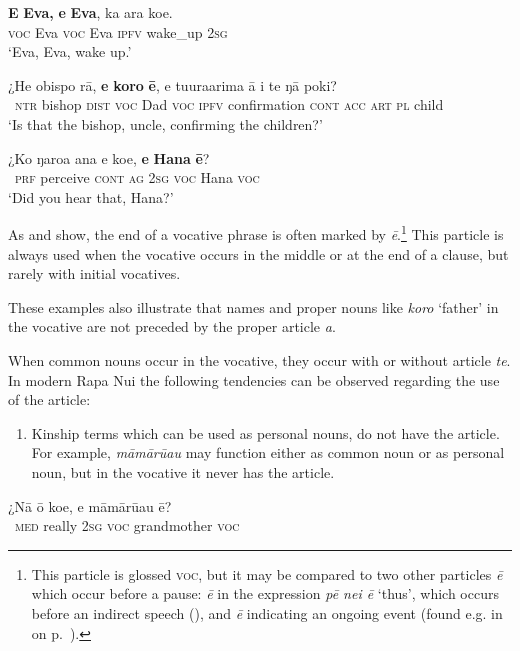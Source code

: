 \ea\label{ex:8.214}
\gll \textbf{E} \textbf{Eva,} \textbf{e} \textbf{Eva}, ka {\ꞌ}ara koe. \\
\textsc{voc} Eva \textsc{voc} Eva \textsc{ipfv} wake\_up \textsc{2sg} \\

\glt 
‘Eva, Eva, wake up.’ \textstyleExampleref{[R210.187]} 
\z

\ea\label{ex:8.215}
\gll ¿He obispo rā, \textbf{e} \textbf{koro} \textbf{ē}, e tu{\ꞌ}ura{\ꞌ}arima {\ꞌ}ā i te ŋā poki?\\
~\textsc{ntr} bishop \textsc{dist} \textsc{voc} Dad \textsc{voc} \textsc{ipfv} confirmation \textsc{cont} \textsc{acc} \textsc{art} \textsc{pl} child\\

\glt 
‘Is that the bishop, uncle, confirming the children?’ \textstyleExampleref{[R413.591]} 
\z

\ea\label{ex:8.216}
\gll ¿Ko ŋaro{\ꞌ}a {\ꞌ}ana e koe, \textbf{e} \textbf{Hana} \textbf{ē}? \\
~\textsc{prf} perceive \textsc{cont} \textsc{ag} \textsc{2sg} \textsc{voc} Hana \textsc{voc} \\

\glt
‘Did you hear that, Hana?’ \textstyleExampleref{[R485.016]} 
\z

As  and  show, the end of a vocative phrase is often marked by \textit{ē}.\footnote{\label{fn:453}This particle is glossed \textsc{voc}, but it may be compared to two other particles \textit{ē} which occur before a pause: \textit{ē} in the expression \textit{pē nei ē} ‘thus’, which occurs before an indirect speech (), and \textit{ē} indicating an ongoing event (found e.g. in  on p.~\pageref{ex:7.159}).} This particle is always used when the vocative occurs in the middle or at the end of a clause, but rarely with initial vocatives.

These examples also illustrate that names and proper nouns like \textit{koro} ‘father’ in the vocative are not preceded by the proper article \textit{a}. 

When common nouns occur in the vocative, they occur with or without article \textit{te}. In modern Rapa Nui the following tendencies can be observed regarding the use of the article:

\begin{enumerate}
\item 
Kinship terms which can be used as personal nouns, do not have the article. For example, \textit{māmārū{\ꞌ}au} may function either as common noun or as personal noun, but in the vocative it never has the article. 
\end{enumerate}
\ea\label{ex:8.217}
\gll ¿Nā {\ꞌ}ō koe, e māmārū{\ꞌ}au ē?\\
~\textsc{med} really \textsc{2sg} \textsc{voc} grandmother \textsc{voc}\\


